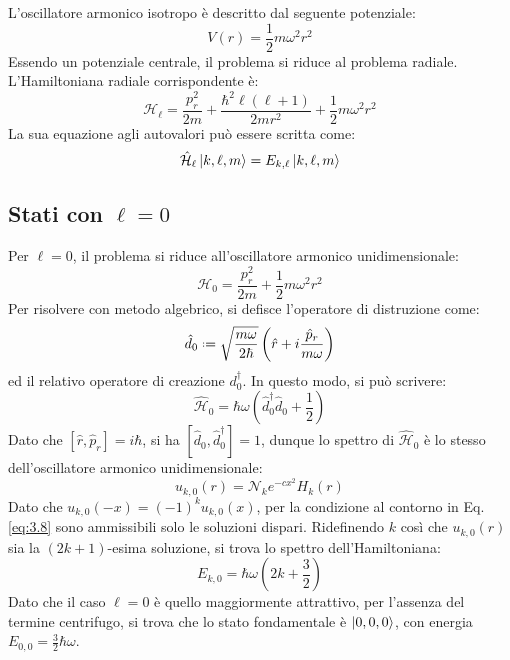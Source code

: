 L'oscillatore armonico isotropo è descritto dal seguente potenziale:
\begin{equation}
	V(r) = \frac{1}{2} m\omega^2 r^2
	\label{eq:3.20}
\end{equation}
Essendo un potenziale centrale, il problema si riduce al problema radiale.
L'Hamiltoniana radiale corrispondente è:
\begin{equation}
	\mathcal{H}_{\ell} = \frac{p_r^2}{2m} + \frac{\hbar^2 \ell(\ell + 1)}{2mr^2} + \frac{1}{2} m\omega^2 r^2
	\label{eq:3.21}
\end{equation}
La sua equazione agli autovalori può essere scritta come:
\begin{equation}
	\hat{\mathcal{H}}_{\ell} \ket{k,\ell,m} = E_{k,\ell} \ket{k,\ell,m}
	\label{eq:3.22}
\end{equation}

\subsection{Stati con \texorpdfstring{$ \ell = 0 $}{TEXT}}

Per $ \ell = 0 $, il problema si riduce all'oscillatore armonico unidimensionale:
\begin{equation}
	\mathcal{H}_0 = \frac{p_r^2}{2m} + \frac{1}{2} m \omega^2 r^2
	\label{eq:3.23}
\end{equation}
Per risolvere con metodo algebrico, si defisce l'operatore di distruzione come:
\begin{equation}
	\hat{d}_0 \defeq \sqrt{\frac{m\omega}{2\hbar}} \left( \hat{r} + i \frac{\hat{p}_r}{m\omega} \right)
	\label{eq:3.24}
\end{equation}
ed il relativo operatore di creazione $ d_0^{\dagger} $. In questo modo, si può scrivere:
\begin{equation}
	\hat{\mathcal{H}}_0 = \hbar \omega \left( \hat{d}_0^{\dagger}\hat{d}_0 + \frac{1}{2} \right)
	\label{eq:3.25}
\end{equation}
Dato che $ \left[ \hat{r},\hat{p}_r \right] = i\hbar $, si ha $ \left[ \hat{d}_0, \hat{d}_0^{\dagger} \right] = 1 $, dunque lo spettro di $ \hat{\mathcal{H}}_0 $ è lo stesso dell'oscillatore armonico unidimensionale:
\begin{equation}
	u_{k,0}(r) = \mathcal{N}_k e^{-c x^2} H_k(r)
	\label{eq:3.26}
\end{equation}
Dato che $ u_{k,0}(-x) = (-1)^k u_{k,0}(x) $, per la condizione al contorno in Eq. \ref{eq:3.8} sono ammissibili solo le soluzioni dispari. Ridefinendo $ k $ così che $ u_{k,0}(r) $ sia la $ (2k+1) $-esima soluzione, si trova lo spettro dell'Hamiltoniana:
\begin{equation}
	E_{k,0} = \hbar \omega \left( 2k + \frac{3}{2} \right)
	\label{eq:3.27}
\end{equation}
Dato che il caso $ \ell = 0 $ è quello maggiormente attrattivo, per l'assenza del termine centrifugo, si trova che lo stato fondamentale è $ \ket{0,0,0} $, con energia $ E_{0,0} = \frac{3}{2} \hbar \omega $.

